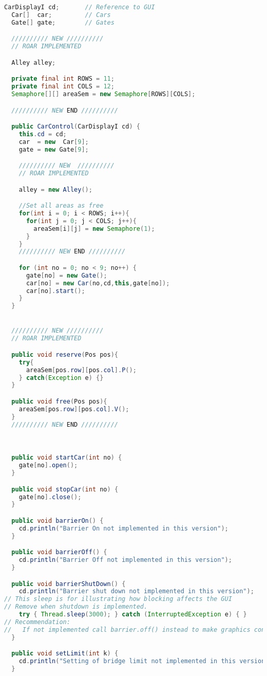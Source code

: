 \begin{lstlisting}[language=java]
  CarDisplayI cd;       // Reference to GUI
  Car[]  car;         // Cars
  Gate[] gate;        // Gates

  ////////// NEW //////////
  // ROAR IMPLEMENTED

  Alley alley;

  private final int ROWS = 11;
  private final int COLS = 12;
  Semaphore[][] areaSem = new Semaphore[ROWS][COLS];

  ////////// NEW END //////////

  public CarControl(CarDisplayI cd) {
    this.cd = cd;
    car  = new  Car[9];
    gate = new Gate[9];

    ////////// NEW  //////////
    // ROAR IMPLEMENTED

    alley = new Alley();

    //Set all areas as free
    for(int i = 0; i < ROWS; i++){
      for(int j = 0; j < COLS; j++){
        areaSem[i][j] = new Semaphore(1);
      }
    }
    ////////// NEW END //////////

    for (int no = 0; no < 9; no++) {
      gate[no] = new Gate();
      car[no] = new Car(no,cd,this,gate[no]);
      car[no].start();
    } 
  }


  ////////// NEW //////////
  // ROAR IMPLEMENTED

  public void reserve(Pos pos){
    try{
      areaSem[pos.row][pos.col].P();
    } catch(Exception e) {}
  }

  public void free(Pos pos){
    areaSem[pos.row][pos.col].V();
  }
  ////////// NEW END //////////



  public void startCar(int no) {
    gate[no].open();
  }

  public void stopCar(int no) {
    gate[no].close();
  }

  public void barrierOn() { 
    cd.println("Barrier On not implemented in this version");
  }

  public void barrierOff() { 
    cd.println("Barrier Off not implemented in this version");
  }

  public void barrierShutDown() { 
    cd.println("Barrier shut down not implemented in this version");
// This sleep is for illustrating how blocking affects the GUI
// Remove when shutdown is implemented.
    try { Thread.sleep(3000); } catch (InterruptedException e) { }
// Recommendation: 
//   If not implemented call barrier.off() instead to make graphics consistent
  }

  public void setLimit(int k) { 
    cd.println("Setting of bridge limit not implemented in this version");
  }


\end{lstlisting}
